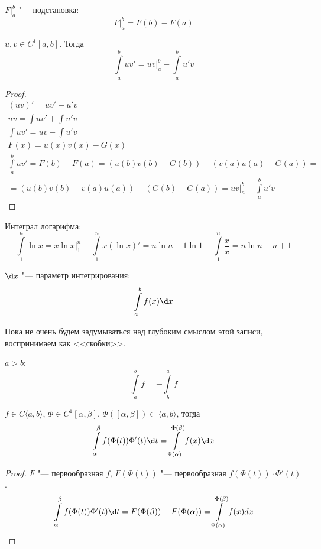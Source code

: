 \begin{Def}
	$ F \bigl|_{a}^{b}$ "--- подстановка:
	\[ F \bigl|_{a}^{b} = F(b) - F(a) \]
\end{Def}

\begin{theorem}
	$u, v \in C^1[a, b]$.
	Тогда
	\[ \int\limits_a^b u v' = uv \biggl|_a^b - \int\limits_a^b u' v \]
\end{theorem}

\begin{proof}
	\begin{gather*}
		(uv)' = u v' + u' v\\
		uv = \int u v' + \int u' v\\
		\int u v' = uv - \int u' v\\
		F(x) = u(x)v(x) - G(x) \\
		\int\limits_a^b u v' = F(b) - F(a) = (u(b)v(b) - G(b)) - (v(a)u(a) - G(a)) = \\
		= (u(b)v(b) - v(a)u(a)) - (G(b) - G(a)) = uv |_{a}^{b} - \int\limits_a^b u' v
	\end{gather*}
\end{proof}

\begin{exmp}
	Интеграл логарифма:
	\[ \int\limits_1^n \ln x = x \ln x \biggl|_{1}^{n} - \int\limits_1^n x (\ln x)' = n \ln n - 1 \ln 1 - \int\limits_1^n \frac{x}{x} = n \ln n - n + 1 \]
\end{exmp}

\begin{Def}
	$\d x$ "--- параметр интегрирования:
	\[ \int\limits_a^b f(x) \d x \]
\end{Def}
Пока не очень будем задумываться над глубоким смыслом этой записи, воспринимаем как <<скобки>>.

\begin{Def}
	$a > b$:
	\[ \int\limits_a^b f = - \int\limits_b^a f \]
\end{Def}

\begin{theorem}
	$f \in C\langle a, b \rangle$,  $\Phi \in C^1[ \alpha, \beta]$, $\Phi([\alpha, \beta]) \subset \langle a, b \rangle$, тогда
	\[ \int\limits_{\alpha}^{\beta} f(\Phi(t)) \Phi'(t) \d t = \int\limits_{\Phi(\alpha)}^{\Phi(\beta)} f(x) \d x\]
\end{theorem}
\begin{proof}
	$F$ "--- первообразная $f$, $F(\Phi(t))$ "--- первообразная $f(\Phi (t)) \cdot \Phi'(t)$.
	\[ \int\limits_{\alpha}^{\beta} f(\Phi (t)) \Phi'(t) \d t = F(\Phi (\beta)) - F(\Phi (\alpha)) = \int\limits_{\Phi(\alpha)}^{\Phi(\beta)} f(x) dx \]
\end{proof}